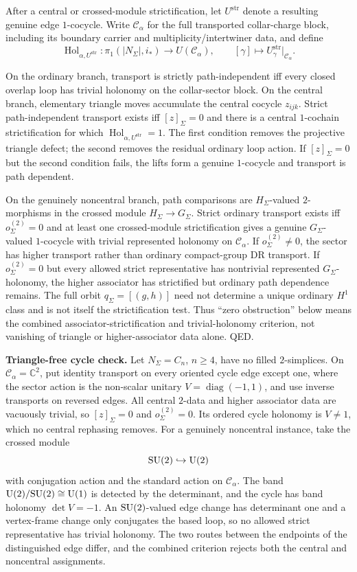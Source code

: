 After a central or crossed-module strictification, let \(U^{\mathrm{str}}\) denote a resulting
genuine edge \(1\)-cocycle. Write \(\mathcal C_\alpha\) for the full transported collar-charge block,
including its boundary carrier and multiplicity/intertwiner data, and define
\[
\operatorname{Hol}_{\alpha,U^{\mathrm{str}}}:\pi_1(|N_\Sigma|,i_*)\longrightarrow U(\mathcal C_\alpha),
\qquad
[\gamma]\longmapsto U^{\mathrm{str}}_\gamma\big|_{\mathcal C_\alpha}.
\]

On the ordinary branch, transport is strictly path-independent iff every closed overlap loop has trivial holonomy on the collar-sector block. On the central branch, elementary triangle moves accumulate the central cocycle \(z_{ijk}\). Strict path-independent transport exists iff \([z]_\Sigma=0\) and there is a central \(1\)-cochain strictification for which \(\operatorname{Hol}_{\alpha,U^{\mathrm{str}}}=1\). The first condition removes the projective triangle defect; the second removes the residual ordinary loop action. If \([z]_\Sigma=0\) but the second condition fails, the lifts form a genuine \(1\)-cocycle and transport is path dependent.

On the genuinely noncentral branch, path comparisons are \(H_\Sigma\)-valued \(2\)-morphisms in
the crossed module \(H_\Sigma\to G_\Sigma\). Strict ordinary transport exists iff
\(o^{(2)}_\Sigma=0\) and at least one crossed-module strictification gives a genuine
\(G_\Sigma\)-valued \(1\)-cocycle with trivial represented holonomy on \(\mathcal C_\alpha\). If
\(o^{(2)}_\Sigma\ne0\), the sector has higher transport rather than ordinary compact-group DR
transport. If \(o^{(2)}_\Sigma=0\) but every allowed strict representative has nontrivial
represented \(G_\Sigma\)-holonomy, the higher associator has strictified but ordinary path
dependence remains. The full orbit \(q_\Sigma=[(g,h)]\) need not determine a unique ordinary
\(H^1\) class and is not itself the strictification test. Thus
``zero obstruction'' below means the combined associator-strictification and trivial-holonomy
criterion, not vanishing of triangle or higher-associator data alone. QED.

\textbf{Triangle-free cycle check.} Let \(N_\Sigma=C_n\), \(n\ge4\), have no filled
\(2\)-simplices. On \(\mathcal C_\alpha=\mathbb C^2\), put identity transport on every oriented
cycle edge except one, where the sector action is the non-scalar unitary
\(V=\operatorname{diag}(-1,1)\), and use inverse transports on reversed edges. All central
\(2\)-data and higher associator data are vacuously trivial, so \([z]_\Sigma=0\) and
\(o^{(2)}_\Sigma=0\). Its ordered cycle holonomy is \(V\ne1\), which no central rephasing removes.
For a genuinely noncentral instance, take the crossed module
\[
\mathrm{SU}(2)\hookrightarrow\mathrm{U}(2)
\]
with conjugation action and the standard action on \(\mathcal C_\alpha\). The band
\(\mathrm{U}(2)/\mathrm{SU}(2)\cong\mathrm{U}(1)\) is detected by the determinant, and the cycle has band holonomy
\(\det V=-1\). An \(\mathrm{SU}(2)\)-valued edge change has determinant one and a vertex-frame change only
conjugates the based loop, so no allowed strict representative has trivial holonomy. The two routes
between the endpoints of the distinguished edge differ, and the combined criterion rejects both
the central and noncentral assignments.

